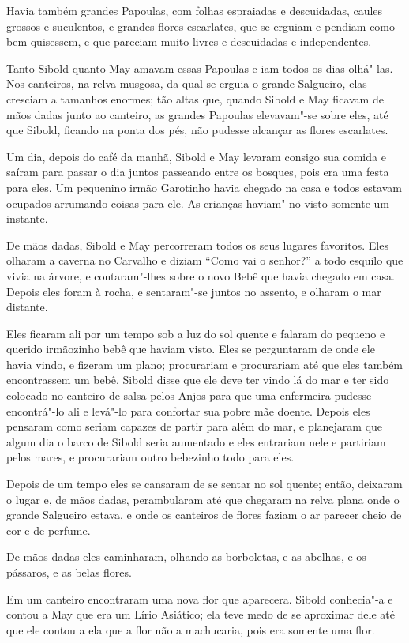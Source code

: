 Havia também grandes Papoulas, com folhas espraiadas e descuidadas,
caules grossos e suculentos, e grandes flores escarlates, que se erguiam
e pendiam como bem quisessem, e que pareciam muito livres e descuidadas
e independentes.

Tanto Sibold quanto May amavam essas Papoulas e iam todos os dias
olhá"-las. Nos canteiros, na relva musgosa, da qual se erguia o grande
Salgueiro, elas cresciam a tamanhos enormes; tão altas que, quando
Sibold e May ficavam de mãos dadas junto ao canteiro, as grandes
Papoulas elevavam"-se sobre eles, até que Sibold, ficando na ponta dos
pés, não pudesse alcançar as flores escarlates.

Um dia, depois do café da manhã, Sibold e May levaram consigo sua comida
e saíram para passar o dia juntos passeando entre os bosques, pois era
uma festa para eles. Um pequenino irmão Garotinho havia chegado na casa
e todos estavam ocupados arrumando coisas para ele. As crianças
haviam"-no visto somente um instante.

De mãos dadas, Sibold e May percorreram todos os seus lugares favoritos.
Eles olharam a caverna no Carvalho e diziam ``Como vai o senhor?'' a
todo esquilo que vivia na árvore, e contaram"-lhes sobre o novo Bebê que
havia chegado em casa. Depois eles foram à rocha, e sentaram"-se juntos
no assento, e olharam o mar distante.

Eles ficaram ali por um tempo sob a luz do sol quente e falaram do
pequeno e querido irmãozinho bebê que haviam visto. Eles se perguntaram
de onde ele havia vindo, e fizeram um plano; procurariam e procurariam
até que eles também encontrassem um bebê. Sibold disse que ele deve ter
vindo lá do mar e ter sido colocado no canteiro de salsa pelos Anjos
para que uma enfermeira pudesse encontrá"-lo ali e levá"-lo para confortar
sua pobre mãe doente. Depois eles pensaram como seriam capazes de partir
para além do mar, e planejaram que algum dia o barco de Sibold seria
aumentado e eles entrariam nele e partiriam pelos mares, e procurariam
outro bebezinho todo para eles.

Depois de um tempo eles se cansaram de se sentar no sol quente; então,
deixaram o lugar e, de mãos dadas, perambularam até que chegaram na
relva plana onde o grande Salgueiro estava, e onde os canteiros de
flores faziam o ar parecer cheio de cor e de perfume.

De mãos dadas eles caminharam, olhando as borboletas, e as abelhas, e os
pássaros, e as belas flores.

Em um canteiro encontraram uma nova flor que aparecera. Sibold
conhecia"-a e contou a May que era um Lírio Asiático; ela teve medo de se
aproximar dele até que ele contou a ela que a flor não a machucaria,
pois era somente uma flor.

